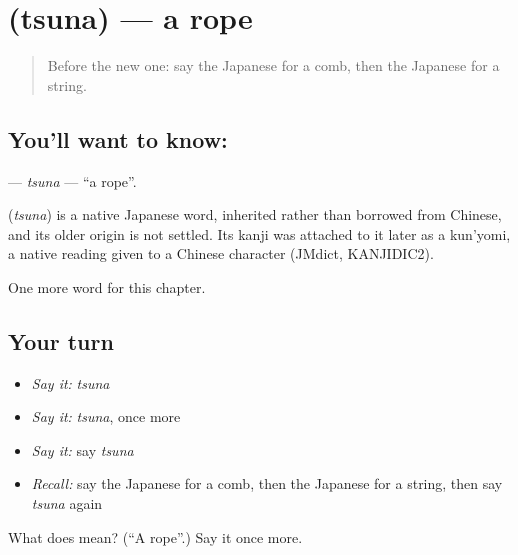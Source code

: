 \section[\texorpdfstring{\ja{つな} (tsuna)}{つな (tsuna)}]{ (tsuna) — a rope}

\label{lesson:JA-C61-tsuna}



\begin{quote}
Before the new one: say the Japanese for a comb, then the Japanese for a string.
\end{quote}

\subsection*{You'll want to know: }
\textbf{} — \emph{tsuna} — \textquotedblleft{}a rope\textquotedblright{}.

\begin{cousinweb}
\textbf{} (\emph{tsuna}) is a native Japanese word, inherited rather than borrowed from Chinese, and its older origin is not settled. Its kanji was attached to it later as a kun'yomi, a native reading given to a Chinese character (JMdict, KANJIDIC2).
\end{cousinweb}

\begin{grammarlens}[title={What you've built}]
One more word for this chapter.
\end{grammarlens}

\subsection*{Your turn}
\begin{itemize}
\raggedright
  \item \emph{Say it:} \emph{tsuna}
  \item \emph{Say it:} \emph{tsuna}, once more
  \item \emph{Say it:} say \emph{tsuna}
  \item \emph{Recall:} say the Japanese for a comb, then the Japanese for a string, then say \emph{tsuna} again
\end{itemize}

\begin{tcolorbox}[breakable,colback=teal!4,colframe=teal!35!black,title={Before you move on}]
What does  mean? (\textquotedblleft{}A rope\textquotedblright{}.) Say it once more.
\end{tcolorbox}
